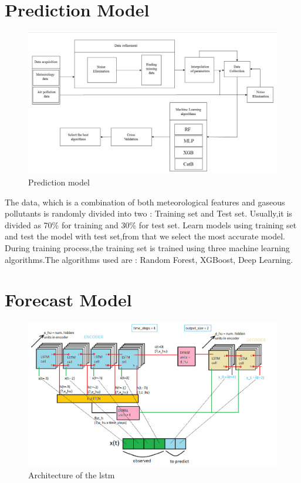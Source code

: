 \section {Prediction Model}

\begin{figure}[h!]
\label{bb}
\centering
\includegraphics[width= 14 cm]{prearch.jpg}
\caption{Prediction model }
\end{figure}
\pagebreak
The data, which is a combination of both meteorological features and gaseous pollutants is randomly divided into two : Training set and Test set. Usually,it is divided as 70\% for training and 30\% for  test set. Learn models using training set and test the model with test set,from that we select the most accurate model. During training process,the training set is trained using three machine learning algorithms.The algorithms used are : Random Forest, XGBoost, Deep Learning.



\section {Forecast Model}

\begin{figure}[h!]
\label{bc}
\centering
\includegraphics[width= 14 cm]{lstm.png}
\caption{Architecture of the lstm}
\end{figure}


